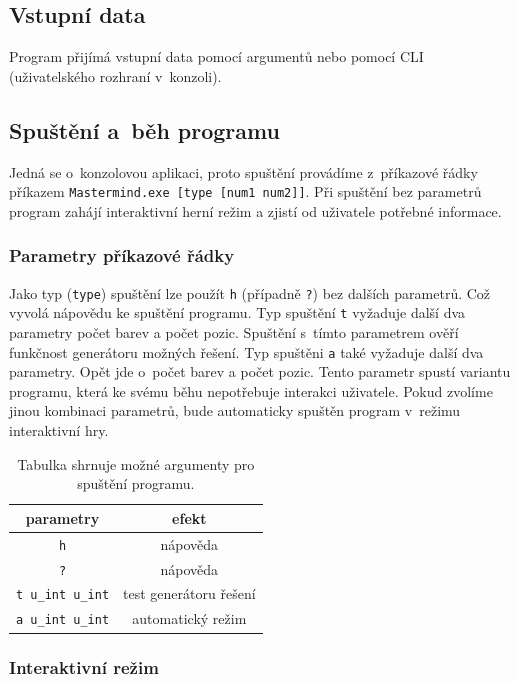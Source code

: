 \documentclass[12pt, a4paper]{article}
\begin{document}
\subsection{Vstupní data}
Program přijímá vstupní data pomocí argumentů nebo pomocí CLI (uživatelského rozhraní v~konzoli).

\subsection{Spuštění a~běh programu}

Jedná se o~konzolovou aplikaci, proto spuštění provádíme z~příkazové řádky příkazem \texttt{Mastermind.exe [type [num1 num2]]}. Při spuštění bez parametrů program zahájí interaktivní herní režim a zjistí od uživatele potřebné informace.

\subsubsection{Parametry příkazové řádky}
Jako typ (\texttt{type}) spuštění lze použít \texttt{h} (případně \texttt{?}) bez dalších parametrů. Což vyvolá nápovědu ke spuštění programu. Typ spuštění \texttt{t} vyžaduje další dva parametry počet barev a počet pozic. Spuštění s~tímto parametrem ověří funkčnost generátoru možných řešení. Typ spuštěni \texttt{a} také vyžaduje další dva parametry. Opět jde o~počet barev a počet pozic. Tento parametr spustí variantu programu, která ke svému běhu nepotřebuje interakci uživatele. Pokud zvolíme jinou kombinaci parametrů, bude automaticky spuštěn program v~režimu interaktivní hry.

\begin{table}[htb]
	\centering
	\begin{tabular}{c | c}
		parametry & efekt\\
		\hline
		\texttt{h} & nápověda\\
		\texttt{?} & nápověda\\
		\texttt{t u\_int u\_int} & test generátoru řešení\\
		\texttt{a u\_int u\_int} & automatický režim
	\end{tabular}     

	\caption{Tabulka shrnuje možné argumenty pro spuštění programu.}
	\label{tab:args}
\end{table}

\subsubsection{Interaktivní režim}
\end{document}
